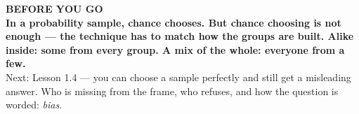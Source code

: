 \documentclass[aspectratio=169, 11pt]{beamer}
\begin{document}
{
\begin{frame}[plain]
  \vspace{1.5cm}\hspace{0.8cm}%
  \begin{minipage}{0.86\textwidth}
    {\color{goldacc}\bfseries\small BEFORE YOU GO}\\[0.7cm]
    {\color{white}\bfseries\Large In a probability sample, chance chooses. But chance
    choosing is not enough --- the technique has to match how the groups are built. Alike
    inside: some from every group. A mix of the whole: everyone from a few.}\\[0.9cm]
    {\color{frostmid}\small Next: Lesson 1.4 --- you can choose a sample perfectly and still
    get a misleading answer. Who is missing from the frame, who refuses, and how the question
    is worded: \emph{bias}.}
  \end{minipage}
\end{frame}
}
\end{document}
